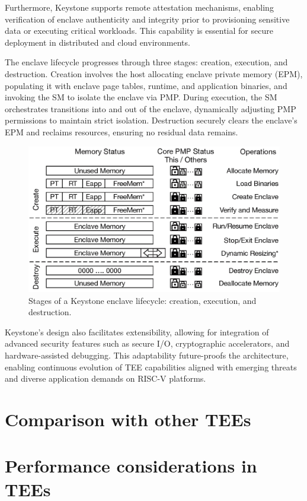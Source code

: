 Furthermore, Keystone supports remote attestation mechanisms, enabling verification of enclave authenticity and integrity prior to provisioning sensitive data or executing critical workloads. This capability is essential for secure deployment in distributed and cloud environments.

The enclave lifecycle progresses through three stages: creation, execution, and destruction. Creation involves the host allocating enclave private memory (EPM), populating it with enclave page tables, runtime, and application binaries, and invoking the SM to isolate the enclave via PMP. During execution, the SM orchestrates transitions into and out of the enclave, dynamically adjusting PMP permissions to maintain strict isolation. Destruction securely clears the enclave’s EPM and reclaims resources, ensuring no residual data remains.

\begin{figure}[htbp]
    \centering
    \includegraphics[width=0.9\linewidth]{figures/enclave_lifecycle.png}
    \caption{Stages of a Keystone enclave lifecycle: creation, execution, and destruction.}
    \label{fig:enclave_lifecycle}
\end{figure}

Keystone’s design also facilitates extensibility, allowing for integration of advanced security features such as secure I/O, cryptographic accelerators, and hardware-assisted debugging. This adaptability future-proofs the architecture, enabling continuous evolution of TEE capabilities aligned with emerging threats and diverse application demands on RISC-V platforms.

\section{Comparison with other TEEs}

\section{Performance considerations in TEEs}